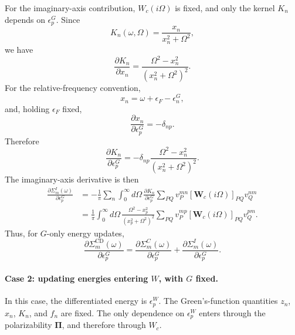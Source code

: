 For the imaginary-axis contribution, \(W_c(i\Omega)\) is fixed, and only the
kernel \(K_n\) depends on \(\epsilon_p^G\).  Since
\begin{equation}
    K_n(\omega,\Omega)
    =
    \frac{x_n}{x_n^2+\Omega^2},
\end{equation}
we have
\begin{equation}
    \frac{\partial K_n}{\partial x_n}
    =
    \frac{\Omega^2-x_n^2}
    {\left(x_n^2+\Omega^2\right)^2}.
\end{equation}
For the relative-frequency convention,
\begin{equation}
    x_n=\omega+\epsilon_F-\epsilon_n^G,
\end{equation}
and, holding \(\epsilon_F\) fixed,
\begin{equation}
    \frac{\partial x_n}{\partial \epsilon_p^G}
    =
    -\delta_{np}.
\end{equation}
Therefore
\begin{equation}
    \frac{\partial K_n}{\partial \epsilon_p^G}
    =
    -\delta_{np}
    \frac{\Omega^2-x_n^2}
    {\left(x_n^2+\Omega^2\right)^2}.
\end{equation}
The imaginary-axis derivative is then
\begin{align}
    \frac{\partial \Sigma_m^I(\omega)}
    {\partial \epsilon_p^G}
    &=
    -\frac{1}{\pi}
    \sum_n
    \int_0^\infty d\Omega\,
    \frac{\partial K_n}{\partial \epsilon_p^G}
    \sum_{PQ}
    v_P^{mn}
    \left[
    \mathbf W_c(i\Omega)
    \right]_{PQ}
    v_Q^{nm} \\
    &=
    \boxed{
    \frac{1}{\pi}
    \int_0^\infty d\Omega\,
    \frac{\Omega^2-x_p^2}
    {\left(x_p^2+\Omega^2\right)^2}
    \sum_{PQ}
    v_P^{mp}
    \left[
    \mathbf W_c(i\Omega)
    \right]_{PQ}
    v_Q^{pm}
    }.
\end{align}
Thus, for \(G\)-only energy updates,
\begin{equation}
    \boxed{
    \frac{\partial \Sigma_m^{\mathrm{CD}}(\omega)}
    {\partial \epsilon_p^G}
    =
    \frac{\partial \Sigma_m^C(\omega)}
    {\partial \epsilon_p^G}
    +
    \frac{\partial \Sigma_m^I(\omega)}
    {\partial \epsilon_p^G}
    }.
\end{equation}

\paragraph{Case 2: updating energies entering \(W\), with \(G\) fixed.}

In this case, the differentiated energy is \(\epsilon_p^W\).  The
Green's-function quantities \(z_n\), \(x_n\), \(K_n\), and \(f_n\) are fixed.
The only dependence on \(\epsilon_p^W\) enters through the polarizability
\(\boldsymbol{\Pi}\), and therefore through \(W_c\).

